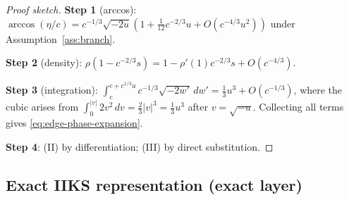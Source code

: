 \documentclass[12pt,a4paper]{amsart}
\theoremstyle{definition}
\theoremstyle{remark}
\begin{document}
\begin{proof}[Proof sketch]
\textbf{Step 1} (arccos):
$\arccos(\eta/c)=c^{-1/3}\sqrt{-2u}(1+\frac{1}{12}c^{-2/3}u
+O(c^{-4/3}u^2))$ under Assumption~\ref{ass:branch}.

\textbf{Step 2} (density):
$\rho(1-c^{-2/3}s)=1-\rho'(1)c^{-2/3}s+O(c^{-4/3})$.

\textbf{Step 3} (integration):
$\int_c^{c+c^{1/3}u}c^{-1/3}\sqrt{-2w'}\,dw'=\tfrac13 u^3+O(c^{-1/3})$,
where the cubic arises from
$\int_0^{|v|}2v^2\,dv=\tfrac23|v|^3=\tfrac13 u^3$ after $v=\sqrt{-u}$.
Collecting all terms gives \eqref{eq:edge-phase-expansion}.

\textbf{Step 4}: (II) by differentiation; (III) by direct substitution.
\end{proof}

\subsection{Exact IIKS representation (exact layer)}
\end{document}
